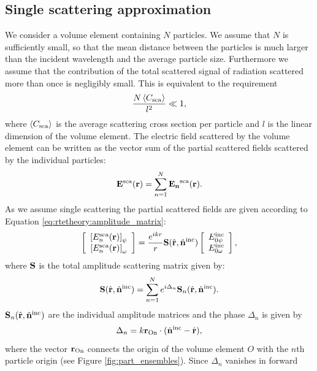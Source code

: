 \subsection{Single scattering approximation}

We consider a volume element containing $N$ particles. We assume that
$N$ is sufficiently small, so that the mean distance between the
particles is much larger than the incident wavelength and the average
particle size. Furthermore we assume that the contribution of the
total scattered signal of radiation scattered more than once is
negligibly small.  This is equivalent to the requirement
\begin{equation}
  \frac{N\left\langle C_{\mathrm{sca}} \right\rangle}{l^2} \ll 1,
\end{equation}
where $\left\langle C_{\mathrm{sca}} \right\rangle$ is the average scattering cross section per
particle and $l$ is the linear dimension of the volume element.  The
electric field scattered by the volume element can be written as the
vector sum of the partial scattered fields scattered by the individual
particles:
\begin{equation}
  \mathbf{E}^{\mathrm{sca}}(\mathbf{r}) = \sum_{n=1}^{N}\mathbf{E_n}^{\mathrm{sca}}(\mathbf{r}).
\end{equation}
As we assume single scattering the partial scattered fields are given
according to Equation \ref{eq:rtetheory:amplitude_matrix}:
\begin{equation}
  \ColVctTwo{\left[ E_n^{\sca}(\VctStl{r}) \right]_\ZntAng}%
         {\left[ E_n^{\sca}(\VctStl{r})\right]_\AzmAng}
         = \frac{e^{ikr}}{r}{\MtrStl{S}(\hat{\VctStl{r}},\hat{\VctStl{n}}^{\inc})} 
 \ColVctTwo{E_{0\ZntAng}^{\inc}}%
         {E_{0\AzmAng}^{\inc}},
\end{equation}
where $\mathbf{S}$ is the total amplitude scattering matrix given by:
\begin{equation}
  \mathbf{S}(\hat{\mathbf{r}},\hat{\mathbf{n}}^{\mathrm{inc}}) = \sum_{n=1}^N e^{i\Delta_n}  {\mathbf{S}_n(\hat{\mathbf{r}},\hat{\mathbf{n}}^{\mathrm{inc}})}.
\end{equation}
$\mathbf{S}_n(\hat{\mathbf{r}},\hat{\mathbf{n}}^{\mathrm{inc}})$ are the individual amplitude
matrices and the phase $\Delta_n$ is given by
\begin{equation}
  \Delta_n = k \mathbf{r}_\mathrm{On} \cdot(\hat{\mathbf{n}}^{\mathrm{inc}} - \hat{\mathbf{r}}),
\end{equation}
where the vector $\mathbf{r}_\mathrm{On}$ connects the origin of the volume
element $O$ with the $n$th particle origin (see
Figure \ref{fig:part_ensembles}).  Since $\Delta_n$ vanishes in forward
